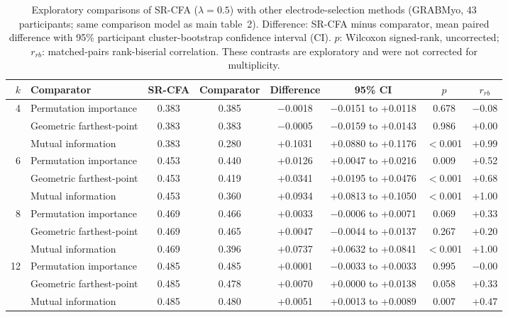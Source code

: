 \begin{table}[htbp]
\centering
\small
\caption{Exploratory comparisons of SR-CFA ($\lambda = 0.5$) with other electrode-selection methods (GRABMyo, 43 participants; same comparison model as main table~2). Difference: SR-CFA minus comparator, mean paired difference with 95\% participant cluster-bootstrap confidence interval (CI). $p$: Wilcoxon signed-rank, uncorrected; $r_{rb}$: matched-pairs rank-biserial correlation. These contrasts are exploratory and were not corrected for multiplicity.}
\label{tab:selection_explor}
\setlength{\tabcolsep}{4pt}
\begin{adjustbox}{max width=\textwidth}
\begin{tabular}{rlcccccc}
\toprule
$k$ & Comparator & SR-CFA & Comparator & Difference & 95\% CI & $p$ & $r_{rb}$ \\
\midrule
4 & Permutation importance & 0.383 & 0.385 & $-$0.0018 & $-$0.0151 to +0.0118 & 0.678 & $-$0.08 \\
 & Geometric farthest-point & 0.383 & 0.383 & $-$0.0005 & $-$0.0159 to +0.0143 & 0.986 & +0.00 \\
 & Mutual information & 0.383 & 0.280 & +0.1031 & +0.0880 to +0.1176 & $<$0.001 & +0.99 \\
\midrule 6 & Permutation importance & 0.453 & 0.440 & +0.0126 & +0.0047 to +0.0216 & 0.009 & +0.52 \\
 & Geometric farthest-point & 0.453 & 0.419 & +0.0341 & +0.0195 to +0.0476 & $<$0.001 & +0.68 \\
 & Mutual information & 0.453 & 0.360 & +0.0934 & +0.0813 to +0.1050 & $<$0.001 & +1.00 \\
\midrule 8 & Permutation importance & 0.469 & 0.466 & +0.0033 & $-$0.0006 to +0.0071 & 0.069 & +0.33 \\
 & Geometric farthest-point & 0.469 & 0.465 & +0.0047 & $-$0.0044 to +0.0137 & 0.267 & +0.20 \\
 & Mutual information & 0.469 & 0.396 & +0.0737 & +0.0632 to +0.0841 & $<$0.001 & +1.00 \\
\midrule 12 & Permutation importance & 0.485 & 0.485 & +0.0001 & $-$0.0033 to +0.0033 & 0.995 & $-$0.00 \\
 & Geometric farthest-point & 0.485 & 0.478 & +0.0070 & +0.0000 to +0.0138 & 0.058 & +0.33 \\
 & Mutual information & 0.485 & 0.480 & +0.0051 & +0.0013 to +0.0089 & 0.007 & +0.47 \\
\bottomrule
\end{tabular}
\end{adjustbox}
\end{table}
